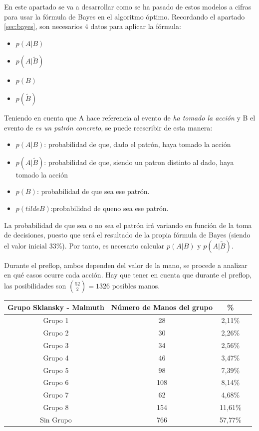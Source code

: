 En este apartado se va a desarrollar como se ha pasado de estos modelos a cifras para usar la fórmula de Bayes en el algoritmo óptimo.
Recordando el apartado \ref{sec:bayes}, son necesarios 4 datos para aplicar la fórmula:

\begin{itemize}
\item $p(A | B)$
\item  $p(A|\tilde{B})$
\item  $p(B)$
\item $p(\tilde{B})$
\end{itemize}

Teniendo en cuenta que A hace referencia al evento de \textit{ha tomado la acción} y B el evento de \textit{es un patrón concreto}, se puede reescribir de esta manera:
\begin{itemize}
\item $p(A | B)$: probabilidad de que, dado el patrón, haya tomado la acción
\item $ p(A|\tilde{B})$:  probabilidad de que, siendo un patron distinto al dado, haya tomado la acción
\item  $p(B)$: probabilidad de que sea ese patrón.
\item $p(tilde{B})$:probabilidad de queno  sea ese patrón.
\end{itemize}
La probabilidad de que sea o no sea el patrón irá variando en función de la toma de decisiones, puesto que será el resultado de la propia fórmula de Bayes (siendo el valor inicial 33\%). Por tanto, es necesario calcular $ p(A | B)$ y $p(A|\tilde{B})$.

Durante el preflop, ambos dependen del valor de la mano, se procede a analizar en qué casos ocurre cada acción. Hay que tener en cuenta que durante el preflop, las posibilidades son $\binom{52}{2}=1326$ posibles manos.


\begin{longtable}[c]{|c|c|c|c|}
\hline
\rowcolor{lightgray}Grupo Sklansky - Malmuth & Número de Manos del grupo & \% \\ \hline
Grupo 1 & 28 & 2,11\% \\ \hline
Grupo 2 & 30 & 2,26\% \\ \hline
Grupo 3 & 34 & 2,56\% \\ \hline
Grupo 4 & 46 & 3,47\% \\ \hline
Grupo 5 & 98 & 7,39\% \\ \hline
Grupo 6 & 108 & 8,14\% \\ \hline
Grupo 7 & 62 & 4,68\% \\ \hline
Grupo 8 & 154 & 11,61\% \\ \hline
Sin Grupo & 766 & 57,77\% \\ \hline
\end{longtable}

